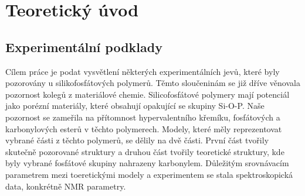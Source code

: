 \documentclass[
  digital, %
  table,   %
  lof,     %
  lot,     %
]{fithesis3}
\begin{document}
\chapter{Teoretický úvod}

\section{Experimentální podklady}
Cílem práce je podat vysvětlení některých experimentálních jevů, které byly pozorovány u silikofosfátových polymerů. Těmto sloučeninám se již dříve věnovala pozornost kolegů z materiálové chemie. Silicofosfátové polymery mají potenciál jako porézní materiály, které obsahují opakující se skupiny Si-O-P\cite{Styskalik2015thesis}.
Naše pozornost se zameřila na přítomnost hypervalentního křemíku, fosfátových a karbonylových esterů v těchto polymerech. Modely, které měly reprezentovat vybrané části z těchto polymerů, se dělily na dvě části. První část tvořily skutečně pozorované struktury a druhou část tvořily teoretické struktury, kde byly vybrané fosfátové skupiny nahrazeny karbonylem. Důležitým srovnávacím parametrem mezi toeretickými modely a experimentem se stala spektroskopická data, konkrétně NMR parametry.
\end{document}

